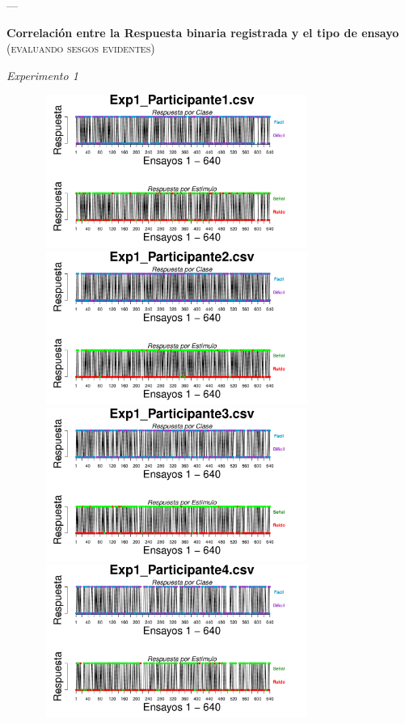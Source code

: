 \documentclass[a4paper ]{article}
\begin{document}
---
\vspace{3mm}
\begin{center}
{\LARGE \textbf{Correlación entre la Respuesta binaria registrada y el tipo de ensayo}}\\
{\small \textsc{(evaluando sesgos evidentes)}}\\
\smallskip
\end{center}
\begin{center}
{\LARGE \textit{Experimento 1}}\\
\end{center}
\vspace{3mm}
\begin{figure}[th]
\centering
\includegraphics[width=9cm, height=5cm]{Figures/BiasResp_Exp1_P1} \includegraphics[width=9cm, height=5cm]{Figures/BiasResp_Exp1_P2} 
\includegraphics[width=9cm, height=5cm]{Figures/BiasResp_Exp1_P3} \includegraphics[width=9cm, height=5cm]{Figures/BiasResp_Exp1_P4} 

\end{figure}
\end{document}

